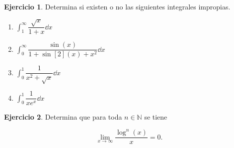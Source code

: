 \documentclass{article}
\theoremstyle{definicion}
\theoremstyle{definition}             %
\theoremstyle{definition}             %
\theoremstyle{definition}
\theoremstyle{definition}
\theoremstyle{observacion}
\theoremstyle{definition}
\theoremstyle{plain}
\theoremstyle{definition}
\theoremstyle{afirmacion}
\theoremstyle{definition}
\newtheorem{eje}{Ejercicio}
\begin{document}
    \begin{eje}
        Determina si existen o no las siguientes integrales impropias.

        \begin{multicols}{2}
            \begin{enumerate}[label = \alph*)]
                \item \(\int_{1}^{\infty} \dfrac{\sqrt{x}}{1 + x}\dd{x}\)
                \item \(\int_{0}^{\infty} \dfrac{\sin(x)}{1 + \sin[2](x) + x^{2}}\dd{x}\)
                \item \(\int_{0}^{1}\dfrac{1}{x^{2} + \sqrt{x}}\dd{x}\)
                \item \(\int_{0}^{1}\dfrac{1}{xe^{x}}\dd{x}\)
            \end{enumerate}
        \end{multicols}
    \end{eje}

    \begin{eje}
        Determina que para toda \(n\in\mathbb{N}\) se tiene 

        \begin{equation*}
            \lim_{x\to\infty}\dfrac{\log^{n}(x)}{x} = 0.
        \end{equation*}
    \end{eje}
\end{document}
